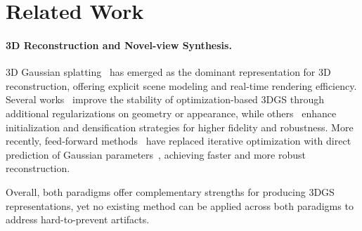 \section{Related Work}
\paragraph{3D Reconstruction and Novel-view Synthesis.} 3D Gaussian splatting~\cite{kerbl3Dgaussians} has emerged as the dominant representation for 3D reconstruction, offering explicit scene modeling and real-time rendering efficiency. Several works~\cite{Niemeyer2021Regnerf,kangle2021dsnerf,turkulainen2024dnsplatter,zhang2024fregs,hyung2024effective} improve the stability of optimization-based 3DGS through additional regularizations on geometry or appearance, while others~\cite{niemeyer2025radsplat,kotovenko2025edgs,Foroutan2024arxiv,kheradmand2024_mcmc} enhance initialization and densification strategies for higher fidelity and robustness. More recently, feed-forward methods~\cite{wang2024dust3r,wang2025vggt,zhang2025flare,keetha2025mapanything} have replaced iterative optimization with direct prediction of Gaussian parameters~\cite{smart2024splatt3r,chen2024mvsplat,charatan2024pixelsplat,xu2024depthsplat,jiang2025anysplat,ye2024no}, achieving faster and more robust reconstruction. %

Overall, both paradigms offer complementary strengths for producing 3DGS representations, yet no existing method can be applied across both paradigms to address hard-to-prevent artifacts.

